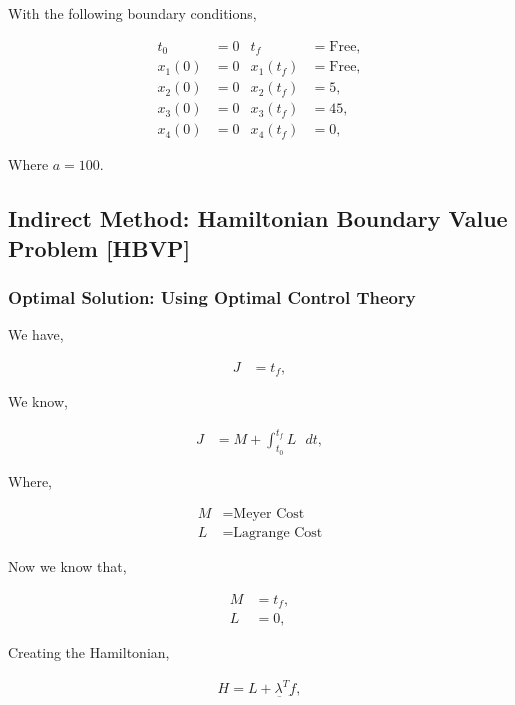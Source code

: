\documentclass[11pt,usenames]{article}
\begin{document}
	With the following boundary conditions,
	
	\begin{align}
	t_{0} &= 0 & t_{f} &= \text{Free}, \nonumber \\
	x_{1}(0) &= 0 & x_{1}(t_{f}) &= \text{Free}, \nonumber \\
	x_{2}(0) &= 0 & x_{2}(t_{f}) &= 5, \\
	x_{3}(0) &= 0 & x_{3}(t_{f}) &= 45, \nonumber \\
	x_{4}(0) &= 0 & x_{4}(t_{f}) &= 0, \nonumber 
	\end{align}
	
	Where $a=100$.
	
	\newpage
	
	
	\subsection{Indirect Method: Hamiltonian Boundary Value Problem [HBVP]}
	\subsubsection{Optimal Solution: Using Optimal Control Theory}
	
	We have,
	
	\begin{align}
	J &= t_{f} , \nonumber  
	\end{align}
	
	We know,
	
	\begin{align}
	J &= M + \int_{t_{0}}^{t_{f}} L \text{   } dt ,  \nonumber 
	\end{align}
	
	Where,
	
	\begin{align}
	M &= \text{Meyer Cost} \nonumber \\
	L &= \text{Lagrange Cost} \nonumber
	\end{align}
	
	Now we know that,
	
	\begin{align}
	M &= t_{f}, \nonumber \\
	L &= 0, \nonumber
	\end{align}
	
	Creating the Hamiltonian,
	
	\begin{align}
	H = L + \underbar{\lambda^{T}} \underbar{f},
	\end{align}
	
\end{document}
